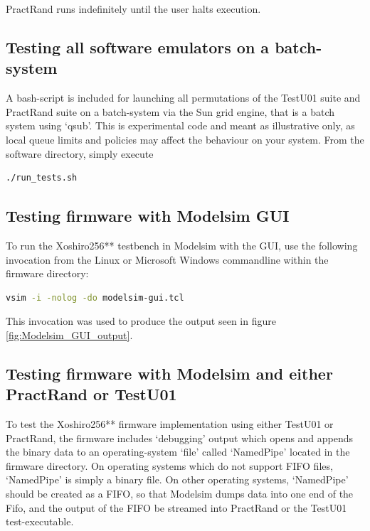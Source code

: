\documentclass{article}
\begin{document}
PractRand runs indefinitely until the user halts execution.

\subsection{Testing all software emulators on a batch-system}

A bash-script is included for launching all permutations of the TestU01 suite and PractRand suite on a batch-system via the Sun grid engine, that is a batch system using `qsub'. This is experimental code and meant as illustrative only, as local queue limits and policies may affect the behaviour on your system. From the software directory, simply execute

\begin{minipage}{1.0\textwidth}
\centering
\begin{lstlisting}[language=bash, label=lst:RunTestsSh]
./run_tests.sh
\end{lstlisting}
\end{minipage}

\subsection{Testing firmware with Modelsim GUI}

To run the Xoshiro256** testbench in Modelsim with the GUI, use the following invocation from the Linux or Microsoft Windows commandline within the firmware directory:

\begin{minipage}{1.0\textwidth}
\centering
\begin{lstlisting}[language=bash , label=lst:ModelsimGui]
vsim -i -nolog -do modelsim-gui.tcl
\end{lstlisting}
\end{minipage}

This invocation was used to produce the output seen in figure \ref{fig:Modelsim_GUI_output}. 

\subsection{Testing firmware with Modelsim and either PractRand or TestU01}

To test the Xoshiro256** firmware implementation using either TestU01 or PractRand, the firmware includes `debugging' output which opens and appends the binary data to an operating-system `file' called `NamedPipe' located in the firmware directory. On operating systems which do not support FIFO files, `NamedPipe' is simply a binary file. On other operating systems, `NamedPipe' should be created as a FIFO, so that Modelsim dumps data into one end of the Fifo, and the output of the FIFO be streamed into PractRand or the TestU01 test-executable.
\end{document}
